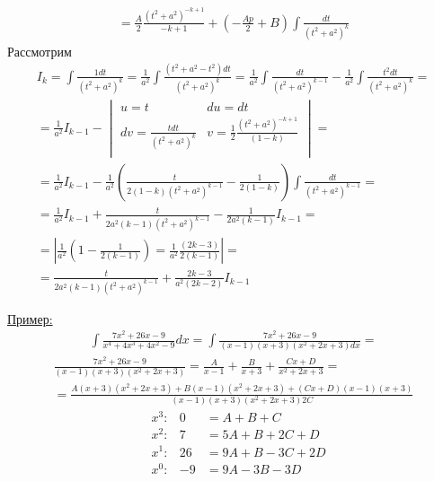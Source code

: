 \documentclass[12pt]{article}
\begin{document}
\begin{enumerate}
\begin{gather*}
            = \frac{A}{2}\frac{(t^2 + a^2)^{-k+1}}{-k+1} + (-\frac{Ap}{2} + B)\int \frac{dt}{(t^2 + a^2)^k}
        \end{gather*}
        Рассмотрим
        \begin{gather*}
            I_k = \int \frac{1dt}{(t^2 + a^2)^k} = \frac{1}{a^2} \int \frac{(t^2 + a^2 - t^2)dt}{(t^2 + a^2)^k} = \frac{1}{a^2} \int \frac{dt}{(t^2+a^2)^{k-1}} - \frac{1}{a^2}\int\frac{t^2dt}{(t^2 + a^2)^k} =\\
            = \frac{1}{a^2}I_{k-1} - \begin{vmatrix}
                u = t & du = dt\\
                dv = \frac{tdt}{(t^2 + a^2)^k} & v = \frac{1}{2}\frac{(t^2+a^2)^{-k+1}}{(1-k)}\\
            \end{vmatrix} =\\
            = \frac{1}{a^2}I_{k-1} - \frac{1}{a^2} \left( \frac{t}{2(1-k)(t^2+a^2)^{k-1}} - \frac{1}{2(1-k)} \right) \int \frac{dt}{(t^2 + a^2)^{k-1}} =\\
            = \frac{1}{a^2}I_{k-1} + \frac{t}{2a^2(k-1)(t^2+a^2)^{k-1}} - \frac{1}{2a^2(k-1)}I_{k-1} =\\
            = \left| \frac{1}{a^2}(1 - \frac{1}{2(k-1)}) = \frac{1}{a^2}\frac{(2k-3)}{2(k-1)} \right| =\\
            = \frac{t}{2a^2(k-1)(t^2+a^2)^{k-1}} + \frac{2k-3}{a^2(2k-2)}I_{k-1}
        \end{gather*}
    \end{enumerate}
    \underline{Пример:}
    \begin{gather*}
        \int \frac{7x^2 + 26x - 9}{x^4 + 4x^3 + 4x^2 - 9}dx = \int \frac{7x^2 + 26x - 9}{(x-1)(x+3)(x^2 + 2x + 3)dx} \boxed{=}
    \end{gather*}
    \begin{gather*}
        \frac{7x^2 + 26x - 9}{(x-1)(x+3)(x^2+2x+3)} = \frac{A}{x-1} + \frac{B}{x+3} + \frac{Cx+D}{x^2+2x+3} =\\
        = \frac{A(x+3)(x^2+2x+3) + B(x-1)(x^2+2x+3) + (Cx+D)(x-1)(x+3)}{(x-1)(x+3)(x^2+2x+3)2C}
    \end{gather*}
    \begin{align*}
        &x^3 : & 0 &= A+B+C\\
        &x^2 : & 7 &= 5A+B+2C+D\\
        &x^1 : & 26 &= 9A+B-3C+2D\\
        &x^0 : & -9 &= 9A-3B-3D
    \end{align*}
\end{document}
